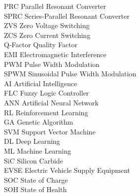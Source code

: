 \documentclass[12pt,a4paper]{report}
\begin{document}
\begin{tabbing}
 

\hspace{1.5cm}PRC \> Parallel Resonant Converter\\
\hspace{1.5cm}SPRC \> Series-Parallel Resonant Converter\\

\hspace{1.5cm}ZVS \> Zero Voltage Switching\\
\hspace{1.5cm}ZCS \> Zero Current Switching\\
\hspace{1.5cm}Q-Factor \> Quality Factor\\
\hspace{1.5cm}EMI \> Electromagnetic Interference\\
\hspace{1.5cm}PWM \> Pulse Width Modulation\\
\hspace{1.5cm}SPWM \> Sinusoidal Pulse Width Modulation\\
\hspace{1.5cm}AI \> Artificial Intelligence\\
\hspace{1.5cm}FLC \> Fuzzy Logic Controller\\
\hspace{1.5cm}ANN \> Artificial Neural Network\\
\hspace{1.5cm}RL \> Reinforcement Learning\\
\hspace{1.5cm}GA \> Genetic Algorithm\\
\hspace{1.5cm}SVM \> Support Vector Machine\\
\hspace{1.5cm}DL \> Deep Learning\\
\hspace{1.5cm}ML \> Machine Learning\\
\hspace{1.5cm}SiC \> Silicon Carbide\\
\hspace{1.5cm}EVSE \> Electric Vehicle Supply Equipment\\
\hspace{1.5cm}SOC \> State of Charge\\
\hspace{1.5cm}SOH \> State of Health\\

\end{tabbing}
\end{document}

